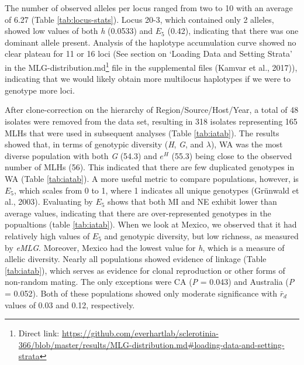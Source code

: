 The number of observed alleles per locus ranged from two to 10 with an
average of 6.27 (Table \ref{tab:locus-stats}). Locus 20-3, which
contained only 2 alleles, showed low values of both \emph{h} (0.0533)
and \(E_5\) (0.42), indicating that there was one dominant allele
present. Analysis of the haplotype accumulation curve showed no clear
plateau for 11 or 16 loci (See section on `Loading Data and Setting
Strata' in the MLG-distribution.md\footnote{Direct link:
  \url{https://github.com/everhartlab/sclerotinia-366/blob/master/results/MLG-distribution.md\#loading-data-and-setting-strata}}
file in the supplemental files (Kamvar et al., 2017)), indicating that
we would likely obtain more multilocus haplotypes if we were to genotype
more loci.

After clone-correction on the hierarchy of Region/Source/Host/Year, a
total of 48 isolates were removed from the data set, resulting in 318
isolates representing 165 MLHs that were used in subsequent analyses
(Table \ref{tab:iatab}). The results showed that, in terms of genotypic
diversity (\emph{H}, \emph{G}, and \(\lambda\)), WA was the most diverse
population with both \emph{G} (54.3) and \(e^H\) (55.3) being close to
the observed number of MLHs (56). This indicated that there are few
duplicated genotypes in WA (Table \ref{tab:iatab}). A more useful metric
to compare populations, however, is \(E_5\), which scales from 0 to 1,
where 1 indicates all unique genotypes (Grünwald et al., 2003).
Evaluating by \(E_5\) shows that both MI and NE exhibit lower than
average values, indicating that there are over-represented genotypes in
the popualtions (table \ref{tab:iatab}). When we look at Mexico, we
observed that it had relatively high values of \(E_5\) and genotypic
diversity, but low richness, as measured by \emph{eMLG}. Moreover,
Mexico had the lowest value for \emph{h}, which is a measure of allelic
diversity. Nearly all populations showed evidence of linkage (Table
\ref{tab:iatab}), which serves as evidence for clonal reproduction or
other forms of non-random mating. The only exceptions were CA (\emph{P}
= 0.043) and Australia (\emph{P} = 0.052). Both of these populations
showed only moderate significance with \(\bar{r}_d\) values of 0.03 and
0.12, respectively.

